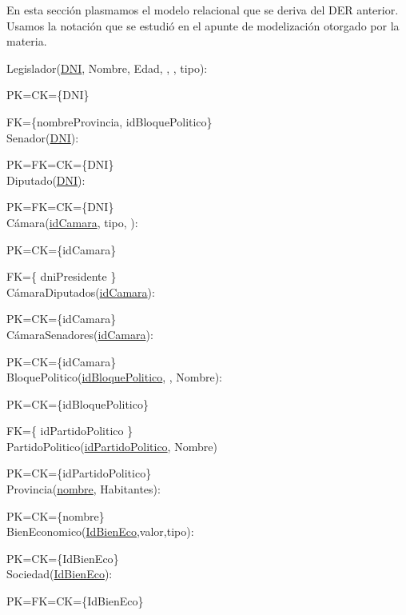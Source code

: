 En esta secci\'on plasmamos el modelo relacional que se deriva del DER anterior. Usamos la notaci\'on que se estudi\'o en el apunte de modelizaci\'on otorgado por la materia.

Legislador(\underline{DNI}, Nombre, Edad, , , tipo):

PK=CK={\{DNI}\}

FK={\{nombreProvincia, idBloquePolitico}\} \\

Senador(\underline{DNI}):

PK=FK=CK={\{DNI}\}\\

Diputado(\underline{DNI}):

PK=FK=CK={\{DNI}\}\\

C\'amara(\underline{idCamara}, tipo, ):

PK=CK={\{idCamara}\}

FK={\{ dniPresidente }\} \\

C\'amaraDiputados(\underline{idCamara}):

PK=CK={\{idCamara}\} \\

C\'amaraSenadores(\underline{idCamara}):

PK=CK={\{idCamara}\} \\

BloquePolitico(\underline{idBloquePolitico}, , Nombre):

PK=CK={\{idBloquePolitico}\}

FK={\{ idPartidoPolitico }\} \\

PartidoPolitico(\underline{idPartidoPolitico}, Nombre)

PK=CK={\{idPartidoPolitico}\}\\

Provincia(\underline{nombre}, Habitantes):

PK=CK={\{nombre}\}\\

BienEconomico(\underline{IdBienEco},valor,tipo):

PK=CK={\{IdBienEco}\}\\

Sociedad(\underline{IdBienEco}):

PK=FK=CK={\{IdBienEco}\}\\

